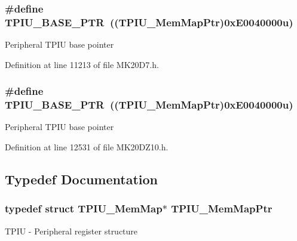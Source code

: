 \subsubsection[{\texorpdfstring{T\+P\+I\+U\+\_\+\+B\+A\+S\+E\+\_\+\+P\+TR}{TPIU_BASE_PTR}}]{\setlength{\rightskip}{0pt plus 5cm}\#define T\+P\+I\+U\+\_\+\+B\+A\+S\+E\+\_\+\+P\+TR~(({\bf T\+P\+I\+U\+\_\+\+Mem\+Map\+Ptr})0x\+E0040000u)}\hypertarget{group___t_p_i_u___peripheral_ga9294dc3ec1881014ac83408db60de6a0}{}\label{group___t_p_i_u___peripheral_ga9294dc3ec1881014ac83408db60de6a0}
Peripheral T\+P\+IU base pointer 

Definition at line 11213 of file M\+K20\+D7.\+h.

\subsubsection[{\texorpdfstring{T\+P\+I\+U\+\_\+\+B\+A\+S\+E\+\_\+\+P\+TR}{TPIU_BASE_PTR}}]{\setlength{\rightskip}{0pt plus 5cm}\#define T\+P\+I\+U\+\_\+\+B\+A\+S\+E\+\_\+\+P\+TR~(({\bf T\+P\+I\+U\+\_\+\+Mem\+Map\+Ptr})0x\+E0040000u)}\hypertarget{group___t_p_i_u___peripheral_ga9294dc3ec1881014ac83408db60de6a0}{}\label{group___t_p_i_u___peripheral_ga9294dc3ec1881014ac83408db60de6a0}
Peripheral T\+P\+IU base pointer 

Definition at line 12531 of file M\+K20\+D\+Z10.\+h.



\subsection{Typedef Documentation}
\subsubsection[{\texorpdfstring{T\+P\+I\+U\+\_\+\+Mem\+Map\+Ptr}{TPIU_MemMapPtr}}]{\setlength{\rightskip}{0pt plus 5cm}typedef struct {\bf T\+P\+I\+U\+\_\+\+Mem\+Map}$\ast$ {\bf T\+P\+I\+U\+\_\+\+Mem\+Map\+Ptr}}\hypertarget{group___t_p_i_u___peripheral_ga300f3eea21a542970734e2c9c0953f4f}{}\label{group___t_p_i_u___peripheral_ga300f3eea21a542970734e2c9c0953f4f}
T\+P\+IU -\/ Peripheral register structure 
